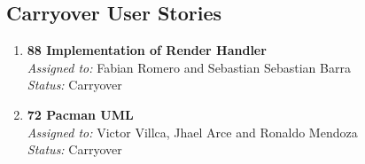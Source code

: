 \subsection*{Carryover User Stories}

\begin{enumerate}
    \item \textbf{88 Implementation of Render Handler} \\
    \textit{Assigned to:} Fabian Romero and Sebastian Sebastian Barra\\
    \textit{Status:} Carryover
    \item \textbf{72 Pacman UML} \\
    \textit{Assigned to:} Victor Villca, Jhael Arce and Ronaldo Mendoza \\
    \textit{Status:} Carryover
\end{enumerate}


